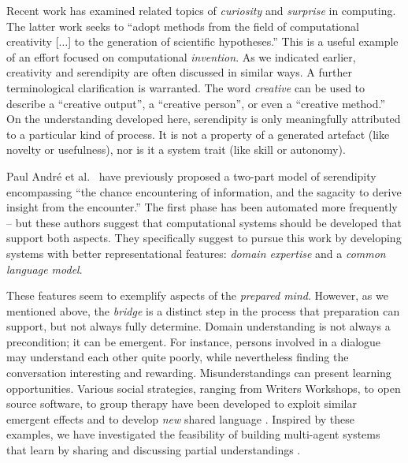 Recent work has examined related topics of \emph{curiosity}
\cite{wu2013curiosity} and \emph{surprise} \cite{grace2014using} in
computing.  The latter work seeks to ``adopt methods from the field
of computational creativity [$\ldots$] to the generation of scientific hypotheses.''  This is a useful example of an effort focused on computational \emph{invention}.  
%
As we indicated earlier, creativity and serendipity are often discussed in similar ways.
A further terminological clarification is warranted.
The word \emph{creative} can be used to describe a ``creative output'',
a ``creative person'', or even a ``creative method.''
On the understanding developed here, serendipity is only meaningfully attributed to a particular kind of process.
It is not a property of a generated artefact (like novelty or usefulness), nor is it a system trait (like skill or autonomy).

Paul Andr{\'e} et al.~\citeyear{andre2009discovery} have previously proposed a
two-part model of serendipity encompassing ``the chance encountering
of information, and the sagacity to derive insight from the
encounter.''  The first phase has been automated more frequently --
but these authors suggest that computational systems should be
developed that support both aspects.  They specifically suggest to
pursue this work by developing systems with better representational
features: \emph{domain expertise} and a \emph{common language model}.

These features seem to exemplify aspects of the \emph{prepared mind}.
However, as we mentioned above, the \emph{bridge} is a distinct step
in the process that preparation can support, but not always fully
determine.  Domain understanding is not always a precondition; it can
be emergent.  For instance, persons involved in a dialogue may
understand each other quite poorly, while nevertheless finding the
conversation interesting and rewarding.  Misunderstandings can present
learning opportunities.  Various social strategies, ranging from
Writers Workshops, to open source software, to group therapy have been
developed to exploit similar emergent effects and to develop
\emph{new} shared language \cite{gabriel2002writer,seikkula2014open}.
Inspired by these examples, we have investigated the feasibility of
building multi-agent systems that learn by sharing and discussing
partial understandings
\cite{corneli2015computational,corneli2015feedback}.

